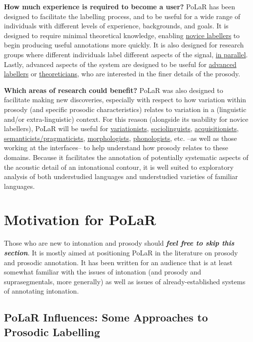 \documentclass[11pt, twoside]{memoir}
\begin{document}
\textbf{How much experience is required to become a user?} PoLaR has been designed to facilitate the labelling process, and to be useful for a wide range of individuals with different levels of experience, backgrounds, and goals. It is designed to require minimal theoretical knowledge, enabling \uline{novice labellers} to begin producing useful annotations more quickly. It is also designed for research groups where different individuals label different aspects of the signal, \uline{in parallel}. Lastly, advanced aspects of the system are designed to be useful for \uline{advanced labellers} or \uline{theoreticians}, who are interested in the finer details of the prosody.

\textbf{Which areas of research could benefit?} PoLaR was also designed to facilitate making new discoveries, especially with respect to how variation within prosody (and specific prosodic characteristics) relates to variation in a (linguistic and/or extra-linguistic) context. For this reason (alongside its usability for novice labellers), PoLaR will be useful for \uline{variationists}, \uline{sociolinguists}, \uline{acquisitionists}, \uline{semanticists\slash pragmaticists}, \uline{morphologists}, \uline{phonologists}, etc. --as well as those working at the interfaces-- to help understand how prosody relates to these domains. Because it facilitates the annotation of potentially systematic aspects of the acoustic detail of an intonational contour, it is well suited to exploratory analysis of both understudied languages and understudied varieties of familiar languages.


\section{Motivation for PoLaR}
Those who are new to intonation and prosody should \textit{\textbf{feel free to skip this section}}. It is mostly aimed at positioning PoLaR in the literature on prosody and prosodic annotation. It has been written for an audience that is at least somewhat familiar with the issues of intonation (and prosody and suprasegmentals, more generally) as well as issues of already-established systems of annotating intonation.

\subsection{PoLaR Influences: Some Approaches to Prosodic Labelling}\label{sec:past-approaches-to-prosodic-labelling}
\end{document}
